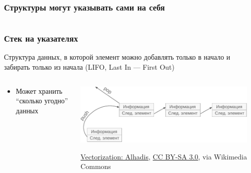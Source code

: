\documentclass[aspectratio=169]{beamer}
\begin{document}
\begin{frame}[fragile]
    \frametitle{Структуры могут указывать сами на себя}
    \begin{footnotesize}
        \inputminted[extrakeywordstype={ListElement}, firstline=4, lastline=22]{c}{structSelf.c}
    \end{footnotesize}
\end{frame}

\begin{frame}
    \frametitle{Стек на указателях}
    Структура данных, в которой элемент можно добавлять только в начало и забирать только из начала (LIFO, Last In --- First Out)
    \begin{columns}
        \begin{small}
            \begin{column}{0.55\textwidth}
                \begin{itemize}
                    \item Может хранить \enquote{сколько угодно} данных
                          \begin{itemize}
                          \end{itemize}
                \end{itemize}
            \end{column}
        \end{small}
        \begin{column}{0.45\textwidth}
            \begin{center}
                \includegraphics[width=0.95\textwidth]{stack.pdf}
                \begin{tiny}
                    \href{https://commons.wikimedia.org/wiki/File:Stack_preview.svg}{Vectorization:  Alhadis}, \href{https://creativecommons.org/licenses/by-sa/3.0}{CC BY-SA 3.0}, via Wikimedia Commons

\end{tiny}
\end{center}
\end{column}
\end{columns}
\end{frame}
\end{document}
